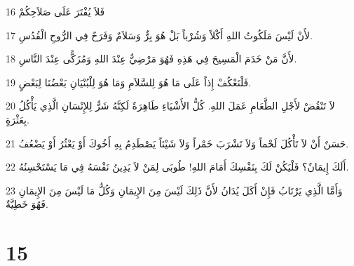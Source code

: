 \par 16 فَلاَ يُفْتَرَ عَلَى صَلاَحِكُمْ
\par 17 لأَنْ لَيْسَ مَلَكُوتُ اللهِ أَكْلاً وَشُرْباً بَلْ هُوَ بِرٌّ وَسَلاَمٌ وَفَرَحٌ فِي الرُّوحِ الْقُدُسِ.
\par 18 لأَنَّ مَنْ خَدَمَ الْمَسِيحَ فِي هَذِهِ فَهُوَ مَرْضِيٌّ عِنْدَ اللهِ وَمُزَكًّى عِنْدَ النَّاسِ.
\par 19 فَلْنَعْكُفْ إِذاً عَلَى مَا هُوَ لِلسَّلاَمِ وَمَا هُوَ لِلْبُنْيَانِ بَعْضُنَا لِبَعْضٍ.
\par 20 لاَ تَنْقُضْ لأَجْلِ الطَّعَامِ عَمَلَ اللهِ. كُلُّ الأَشْيَاءِ طَاهِرَةٌ لَكِنَّهُ شَرٌّ لِلإِنْسَانِ الَّذِي يَأْكُلُ بِعَثْرَةٍ.
\par 21 حَسَنٌ أَنْ لاَ تَأْكُلَ لَحْماً وَلاَ تَشْرَبَ خَمْراً وَلاَ شَيْئاً يَصْطَدِمُ بِهِ أَخُوكَ أَوْ يَعْثُرُ أَوْ يَضْعُفُ.
\par 22 أَلَكَ إِيمَانٌ؟ فَلْيَكُنْ لَكَ بِنَفْسِكَ أَمَامَ اللهِ! طُوبَى لِمَنْ لاَ يَدِينُ نَفْسَهُ فِي مَا يَسْتَحْسِنُهُ.
\par 23 وَأَمَّا الَّذِي يَرْتَابُ فَإِنْ أَكَلَ يُدَانُ لأَنَّ ذَلِكَ لَيْسَ مِنَ الإِيمَانِ وَكُلُّ مَا لَيْسَ مِنَ الإِيمَانِ فَهُوَ خَطِيَّةٌ.

\chapter{15}

